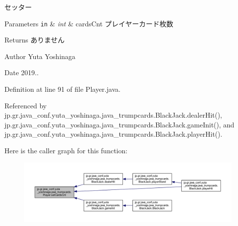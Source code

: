 セッター 


\begin{DoxyParams}[1]{Parameters}
\mbox{\tt in}  & {\em int} & cards\+Cnt プレイヤーカード枚数 \\
\hline
\end{DoxyParams}
\begin{DoxyReturn}{Returns}
ありません 
\end{DoxyReturn}
\begin{DoxyAuthor}{Author}
Yuta Yoshinaga 
\end{DoxyAuthor}
\begin{DoxyDate}{Date}
2019.. 
\end{DoxyDate}


Definition at line 91 of file Player.\+java.



Referenced by jp.\+gr.\+java\+\_\+conf.\+yuta\+\_\+yoshinaga.\+java\+\_\+trumpcards.\+Black\+Jack.\+dealer\+Hit(), jp.\+gr.\+java\+\_\+conf.\+yuta\+\_\+yoshinaga.\+java\+\_\+trumpcards.\+Black\+Jack.\+game\+Init(), and jp.\+gr.\+java\+\_\+conf.\+yuta\+\_\+yoshinaga.\+java\+\_\+trumpcards.\+Black\+Jack.\+player\+Hit().

Here is the caller graph for this function\+:
\nopagebreak
\begin{figure}[H]
\begin{center}
\leavevmode
\includegraphics[width=350pt]{classjp_1_1gr_1_1java__conf_1_1yuta__yoshinaga_1_1java__trumpcards_1_1_player_a658b393d95e9658b88c8aedcb44a5728_icgraph}
\end{center}
\end{figure}
\mbox{\label{classjp_1_1gr_1_1java__conf_1_1yuta__yoshinaga_1_1java__trumpcards_1_1_player_a6c4e87ec9e1c67bfc9b754690b13c542}} 
